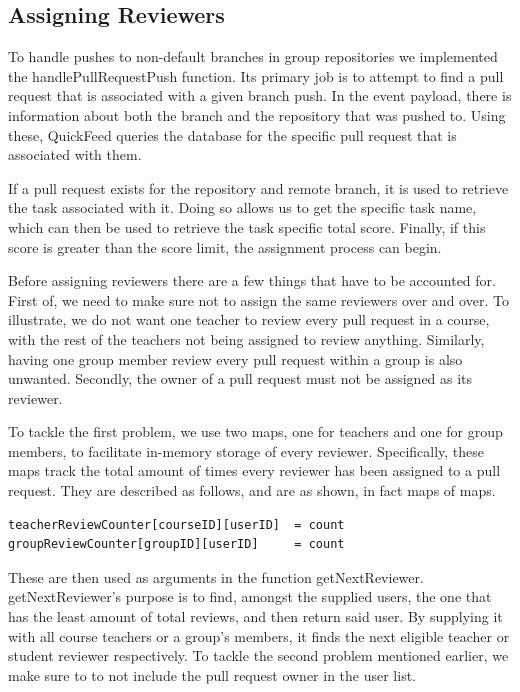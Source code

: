 \subsection{Assigning Reviewers}
\label{sec:assigning-reviewers}

To handle pushes to non-default branches in group repositories we implemented the handlePullRequestPush function.
Its primary job is to attempt to find a pull request that is associated with a given branch push.
In the event payload, there is information about both the branch and the repository that was pushed to.
Using these, QuickFeed queries the database for the specific pull request that is associated with them.

If a pull request exists for the repository and remote branch, it is used to retrieve the task associated with it.
Doing so allows us to get the specific task name, which can then be used to retrieve the task specific total score.
Finally, if this score is greater than the score limit, the assignment process can begin.

Before assigning reviewers there are a few things that have to be accounted for.
First of, we need to make sure not to assign the same reviewers over and over.
To illustrate, we do not want one teacher to review every pull request in a course, with the rest of the teachers not being assigned to review anything.
Similarly, having one group member review every pull request within a group is also unwanted.
Secondly, the owner of a pull request must not be assigned as its reviewer.

To tackle the first problem, we use two maps, one for teachers and one for group members, to facilitate in-memory storage of every reviewer.
Specifically, these maps track the total amount of times every reviewer has been assigned to a pull request.
They are described as follows, and are as shown, in fact maps of maps.

\begin{lstlisting}[caption={Maps used to store review counts}, language=Golang, numbers=none, basicstyle=\ttfamily\footnotesize]
teacherReviewCounter[courseID][userID]  = count
groupReviewCounter[groupID][userID]     = count
\end{lstlisting}

These are then used as arguments in the function getNextReviewer.
getNextReviewer's purpose is to find, amongst the supplied users, the one that has the least amount of total reviews, and then return said user.
By supplying it with all course teachers or a group's members, it finds the next eligible teacher or student reviewer respectively.
To tackle the second problem mentioned earlier, we make sure to to not include the pull request owner in the user list.

